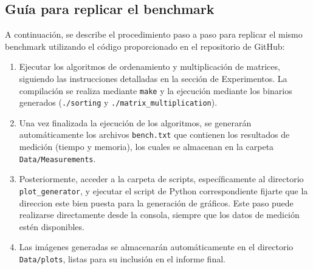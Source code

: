 \subsection{Guía para replicar el benchmark}

A continuación, se describe el procedimiento paso a paso para replicar el mismo benchmark utilizando el código proporcionado en el repositorio de GitHub:

\begin{enumerate}
    \item Ejecutar los algoritmos de ordenamiento y multiplicación de matrices, siguiendo las instrucciones detalladas en la sección de Experimentos. La compilación se realiza mediante \texttt{make} y la ejecución mediante los binarios generados (\texttt{./sorting} y \texttt{./matrix\_multiplication}).
    
    \item Una vez finalizada la ejecución de los algoritmos, se generarán automáticamente los archivos \texttt{bench.txt} que contienen los resultados de medición (tiempo y memoria), los cuales se almacenan en la carpeta \texttt{Data/Measurements}.
    
    \item Posteriormente, acceder a la carpeta de scripts, específicamente al directorio \texttt{plot\_generator}, y ejecutar el script de Python correspondiente fijarte que la direccion este bien puesta para la generación de gráficos. Este paso puede realizarse directamente desde la consola, siempre que los datos de medición estén disponibles.
    
    \item Las imágenes generadas se almacenarán automáticamente en el directorio \texttt{Data/plots}, listas para su inclusión en el informe final.
\end{enumerate}

